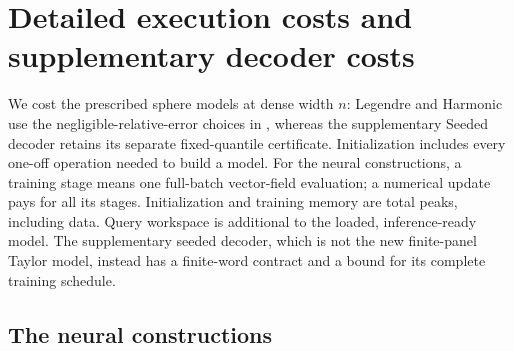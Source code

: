 \section{Detailed execution costs and supplementary decoder costs}
\label{app:execution-costs}

We cost the prescribed sphere models at dense width $n$: Legendre and
Harmonic use the negligible-relative-error choices in
, whereas the supplementary Seeded decoder retains
its separate fixed-quantile certificate. Initialization
includes every one-off operation needed to build a model. For the neural
constructions, a training stage means one full-batch vector-field
evaluation; a numerical update pays for all its stages. Initialization and
training memory are total peaks, including data. Query workspace is
additional to the loaded, inference-ready model. The supplementary seeded decoder, which is not the new finite-panel Taylor model, instead has
a finite-word contract and a bound for its complete training schedule.

\subsection{The neural constructions}

